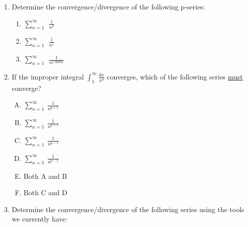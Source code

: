 \documentclass[10pt]{article}
\begin{document}
\begin{enumerate}

\item Determine the convergence/divergence of the following p-series:

\begin{enumerate} \label{first}
\item \(\sum_{n=1}^\infty\ \ \frac{1}{n^3}\)

\item \(\sum_{n=1}^\infty\ \ \frac{1}{n^1}\) \label{harm}

\item \(\sum_{n=1}^\infty\ \ \frac{1}{n^{1.00001}}\) \label{00001}
\end{enumerate}

\vfill


\item If the improper integral \(\int_5^\infty \frac{dx}{x^p}\) converges, which of the following series \underline{must} converge?\label{prob4}
\begin{enumerate}[A)]
\item \(\sum_{n=1}^\infty \ \frac{1}{n^{p+1}}\)

\item \(\sum_{n=5}^\infty \ \frac{1}{n^{p+1}}\)

\item \(\sum_{n=1}^\infty \ \frac{1}{n^{p-1}}\)

\item \(\sum_{n=5}^\infty \ \frac{1}{n^{p-1}}\)

\item Both A and B

\item Both C and D

\end{enumerate}

\vfill

\item Determine the convergence/divergence of the following series using the tools we currently have: \label{prob3}
\begin{enumerate}[a)]


\end{enumerate}
\end{enumerate}
\end{document}
